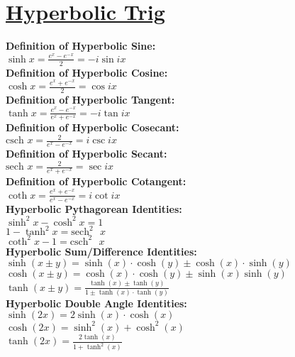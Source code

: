 \documentclass[12pt]{article}
\begin{document}
\section*{\underline{Hyperbolic Trig}}
\textbf{Definition of Hyperbolic Sine:}
    \\ \( \sinh x = \displaystyle\frac{ e^x - e^{-x} }{ 2 } = -i \sin ix \)
\\ \textbf{Definition of Hyperbolic Cosine:}
    \\ \( \cosh x = \displaystyle\frac{ e^x + e^{-x} }{ 2 } = \cos ix \)
\\ \textbf{Definition of Hyperbolic Tangent:}
    \\ \( \tanh x = \displaystyle\frac{ e^x - e^{-x} }{ e^x + e^{-x} } = -i \tan ix \)
\\ \textbf{Definition of Hyperbolic Cosecant:}
    \\ \( \text{csch } x = \displaystyle\frac{ 2 }{ e^x - e^{-x} } = i \csc ix \)
\\ \textbf{Definition of Hyperbolic Secant:}
    \\ \( \text{sech } x = \displaystyle\frac{ 2 }{ e^x + e^{-x} } = \sec ix \)
\\ \textbf{Definition of Hyperbolic Cotangent:}
    \\ \( \coth x = \displaystyle\frac{ e^x + e^{-x} }{ e^x - e^{-x} } = i \cot ix \)
\\ \textbf{Hyperbolic Pythagorean Identities:}
    \\ \( \sinh^2 x - \cosh^2 x = 1 \)
    \\ \( 1 - \tanh^2 x = \text{sech}^2 \text{ } x \)
    \\ \( \coth^2 x - 1 = \text{csch}^2 \text{ } x \)
\\ \textbf{Hyperbolic Sum/Difference Identities:}
    \\ \( \sinh( x \pm y ) = \sinh( x ) \cdot \cosh( y ) \pm \cosh( x ) \cdot \sinh( y ) \)
    \\ \( \cosh( x \pm y ) = \cosh( x ) \cdot \cosh( y ) \pm \sinh( x ) \sinh( y ) \)
    \\ \( \tanh( x \pm y ) = \displaystyle\frac{ \tanh( x ) \pm \tanh( y ) }{ 1 \pm \tanh( x ) \cdot \tanh( y ) } \)
\\ \textbf{Hyperbolic Double Angle Identities:}
    \\ \( \sinh( 2x ) = 2 \sinh( x ) \cdot \cosh( x ) \)
    \\ \( \cosh( 2x ) = \sinh^2( x ) + \cosh^2( x ) \)
    \\ \( \tanh( 2x ) = \displaystyle\frac{ 2 \tanh( x ) }{ 1 + \tanh^2( x ) } \)
\end{document}
